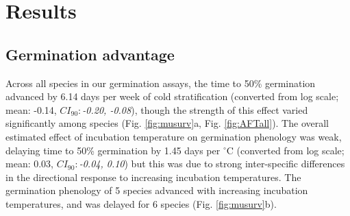 \documentclass{article}[11pt]
\begin{document}

\section*{Results}
\subsection*{Germination advantage}
Across all species in our germination assays, the time to 50\% germination advanced by 6.14 days per week of cold stratification (converted from log scale; mean: -0.14, $CI_{90}:$\textit{-0.20, -0.08}), though the strength of this effect varied significantly among species  (Fig. \ref{fig:musurv}a, Fig. \ref{fig:AFTall}). The overall estimated effect of incubation temperature on germination phenology was weak, delaying time to 50\% germination by 1.45 days per  $^{\circ}$C (converted from log scale; mean: 0.03, $CI_{90}:$\textit{-0.04, 0.10}) but this was due to strong inter-specific differences in the directional response to increasing incubation temperatures. The germination phenology of 5 species advanced with increasing incubation temperatures, and was delayed for 6 species (Fig. \ref{fig:musurv}b).\\%
\end{document}
